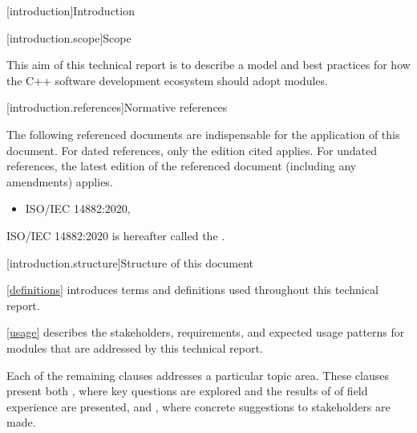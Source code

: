 
[introduction]{Introduction}

[introduction.scope]{Scope}

\pnum
{}%
This aim of this technical report is to describe a model and best practices for
how the C++ software development ecosystem should adopt modules.
%

%
[introduction.references]{Normative references}

\pnum
{}%
The following referenced documents are indispensable for the application of this
document.
For dated references, only the edition cited applies.
For undated references, the latest edition of the referenced document
(including any amendments) applies.

\begin{itemize}
\item ISO/IEC 14882:2020, 
\end{itemize}

\pnum
ISO/IEC 14882:2020 is hereafter called the .

[introduction.structure]{Structure of this document}

\pnum
{}%
\ref{definitions} introduces terms and definitions used throughout this
technical report.

\ref{usage} describes the stakeholders, requirements, and expected usage
patterns for modules that are addressed by this technical report.

\pnum
Each of the remaining clauses addresses a particular topic area.
These clauses present both , where key questions are
explored and the results of of field experience are presented, and
, where concrete suggestions to stakeholders are made.

